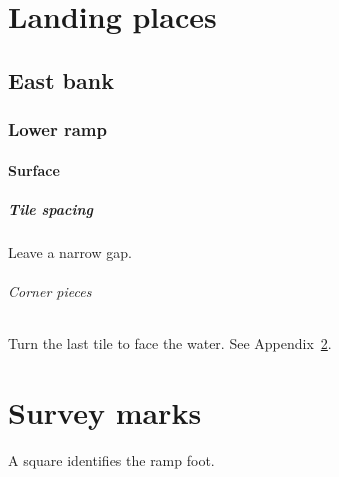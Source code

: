 \documentclass{report}
\begin{document}
\setcounter{secnumdepth}{5}\setcounter{tocdepth}{3}
\tableofcontents
\chapter{Landing places}\section{East bank}\subsection{Lower ramp}
\subsubsection{Surface}\paragraph{Tile spacing}Leave a narrow gap.
\subparagraph{Corner pieces}Turn the last tile to face the water. See Appendix~\ref{app:marks}.
\appendix\chapter{Survey marks}\label{app:marks}A square identifies the ramp foot.
\end{document}
